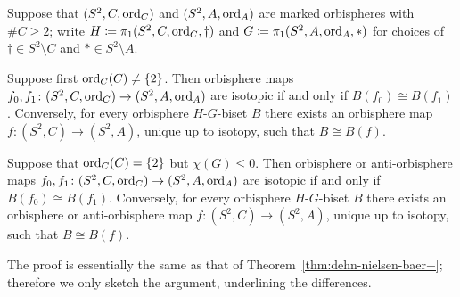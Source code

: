 \documentclass{amsart}
\begin{document}
\begin{thm}\label{thm:dehn-nielsen-baer++}
  Suppose that $(S^2,C,\operatorname{ord}_C)$ and $(S^2,A,\operatorname{ord}_A)$ are marked
  orbispheres with $\#C\ge 2$; write
  $H\coloneqq\pi_1(S^2,C,\operatorname{ord}_C,\dagger)$ and
  $G\coloneqq\pi_1(S^2,A,\operatorname{ord}_A,*)$ for choices of $\dagger\in
  S^2\setminus C$ and $*\in S^2\setminus A$.

  Suppose first $\operatorname{ord}_C(C)\neq \{2\}$. Then orbisphere maps
  $f_0,f_1\colon(S^2,C,\operatorname{ord}_C)\to(S^2,A,\operatorname{ord}_A)$ are isotopic
  if and only if $B(f_0)\cong B(f_1)$. Conversely, for every
  orbisphere $H$-$G$-biset $B$ there exists an orbisphere map
  $f\colon(S^2,C)\to(S^2,A)$, unique up to isotopy, such that
  $B\cong B(f)$.
  
  Suppose that $\operatorname{ord}_C(C)= \{2\}$ but $\chi(G)\le 0$. Then orbisphere
  or anti-orbisphere maps
  $f_0,f_1\colon(S^2,C,\operatorname{ord}_C)\to(S^2,A,\operatorname{ord}_A)$ are isotopic
  if and only if $B(f_0)\cong B(f_1)$. Conversely, for every
  orbisphere $H$-$G$-biset $B$ there exists an orbisphere or
  anti-orbisphere map $f\colon(S^2,C)\to(S^2,A)$, unique up to isotopy, such that $B\cong B(f)$.
\end{thm}
\noindent The proof is essentially the same as that of
Theorem~\ref{thm:dehn-nielsen-baer+}; therefore we only sketch the
argument, underlining the differences.
\end{document}
